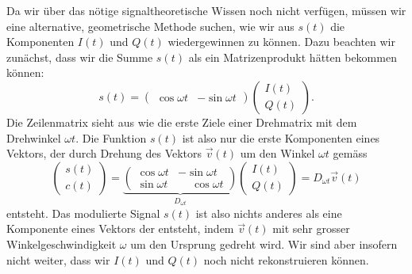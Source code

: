Da wir über das nötige signaltheoretische Wissen noch nicht verfügen,
müssen wir eine alternative, geometrische Methode suchen, wie wir
aus $s(t)$ die Komponenten $I(t)$ und $Q(t)$ wiedergewinnen zu können.
Dazu beachten wir zunächst, dass wir die Summe $s(t)$ als ein
Matrizenprodukt hätten bekommen können:
\[
s(t)
=
\begin{pmatrix}\cos\omega t&-\sin\omega t\end{pmatrix}
\begin{pmatrix}I(t)\\Q(t)\end{pmatrix}.
\]
Die Zeilenmatrix sieht aus wie die erste Ziele einer Drehmatrix
mit dem Drehwinkel $\omega t$.
Die Funktion $s(t)$ ist also nur die erste Komponenten eines
Vektors, der durch Drehung des Vektors $\vec{v}(t)$ um den
Winkel $\omega t$ gemäss
\begin{equation}
\begin{pmatrix} s(t)\\ c(t) \end{pmatrix}
=
\underbrace{
\begin{pmatrix}
\cos\omega t & -\sin\omega t\\
\sin\omega t & \phantom{-}\cos\omega t
\end{pmatrix}}_{\displaystyle D_{\omega t}}
\begin{pmatrix}I(t)\\Q(t)\end{pmatrix}
=
D_{\omega t} \vec{v}(t)
\label{eqn:qam:modulation}
\end{equation}
entsteht.
Das modulierte Signal $s(t)$ ist also nichts anderes als eine
Komponente eines Vektors der entsteht, indem $\vec{v}(t)$ mit sehr grosser
Winkelgeschwindigkeit $\omega$ um den Ursprung gedreht wird.
Wir sind aber insofern nicht weiter, dass wir $I(t)$ und $Q(t)$ noch nicht
rekonstruieren können.



